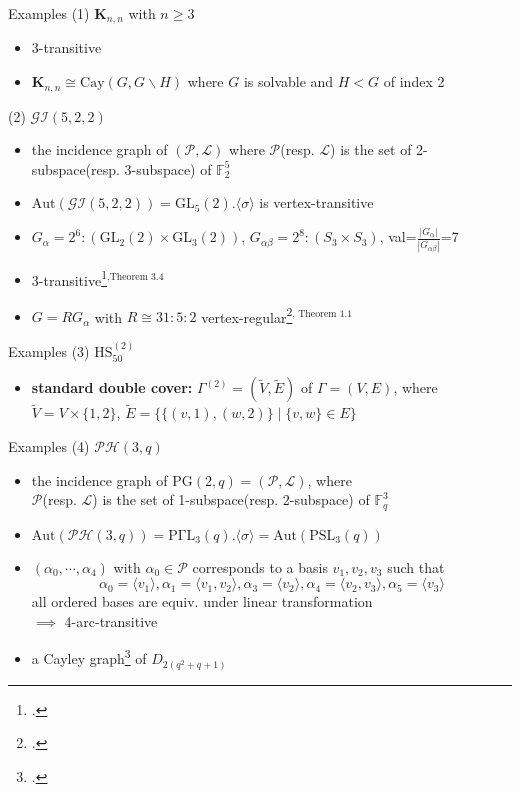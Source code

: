 \documentclass{beamer}
\def\GL{\mathrm{GL}}
\def\PSL{\mathrm{PSL}}
\def\PGaL{\mathrm{P\Gamma L}}
\def\Aut{\mathrm{Aut}}
\def\Cay{\mathrm{Cay}}
\def\HS{\mathrm{HS}}
\def\PH{\mathcal{PH}}
\def\GI{\mathcal{GI}}
\def\PG{\mathrm{PG}}
\begin{document}
\begin{frame}{Examples}
(1) $\mathbf{K}_{n,n}$ with $n\geq 3$
\begin{itemize}
	\item 3-transitive
	\item $\mathbf{K}_{n,n}\cong \Cay(G,G\backslash H)$ where $G$ is solvable and $H<G$ of index 2
\end{itemize}

(2) $\mathcal{GI}(5,2,2)$
\begin{itemize}
	\item the incidence graph of $(\mathcal{P,L})$ where $\mathcal{P}$(resp. $\mathcal{L}$) is the set of 2-subspace(resp. 3-subspace) of $\mathbb{F}_2^5$
	\item $\Aut(\GI(5,2,2))=\GL_5(2).\langle \sigma\rangle$ is vertex-transitive
	\item $G_\alpha=2^6:(\GL_2(2)\times\GL_3(2))$, $G_{\alpha\beta}=2^8:(S_3\times S_3)$, val=$\frac{|G_\alpha|}{|G_{\alpha\beta}|}$=7
	\item 3-transitive\footcite{LI20162907}$^\text{,Theorem 3.4}$
	\item $G=RG_\alpha$ with $R\cong 31:5:2$ vertex-regular\footcite{LI2022factorizations}$^\text{, Theorem 1.1}$
\end{itemize}

\end{frame}

\begin{frame}{Examples}
(3) $\HS_{50}^{(2)}$
\begin{itemize}
	\item \textbf{standard double cover:} $\Gamma^{(2)}=(\tilde{V},\tilde{E})$ of $\Gamma=(V,E)$, where\\ $\tilde{V}=V\times\{1,2\}$, $\tilde{E}=\{\{(v,1),(w,2)\}\mid\{v,w\}\in E\}$
\end{itemize}
\end{frame}

\begin{frame}{Examples}
(4) $\mathcal{PH}(3,q)$
\begin{itemize}
	\item the incidence graph of $\PG(2,q)=(\mathcal{P,L})$, where \\$\mathcal{P}$(resp. $\mathcal{L}$) is the set of 1-subspace(resp. 2-subspace) of $\mathbb{F}_q^3$
	\item $\Aut(\PH(3,q))=\PGaL_3(q).\langle \sigma\rangle=\Aut(\PSL_3(q))$
	\item $(\alpha_0,\cdots,\alpha_4)$ with $\alpha_0\in \mathcal{P}$ corresponds to a basis $v_1,v_2,v_3$ such that\[ \alpha_0=\langle v_1\rangle, \alpha_1=\langle v_1,v_2\rangle, \alpha_3=\langle v_2\rangle, \alpha_4=\langle v_2,v_3\rangle, \alpha_5=\langle v_3\rangle \]all ordered bases are equiv. under linear transformation\\$\implies$ 4-arc-transitive
	\item a Cayley graph\footcite{MARUSIC2003162} of $D_{2(q^2+q+1)}$ 
\end{itemize}
\end{frame}
\end{document}
